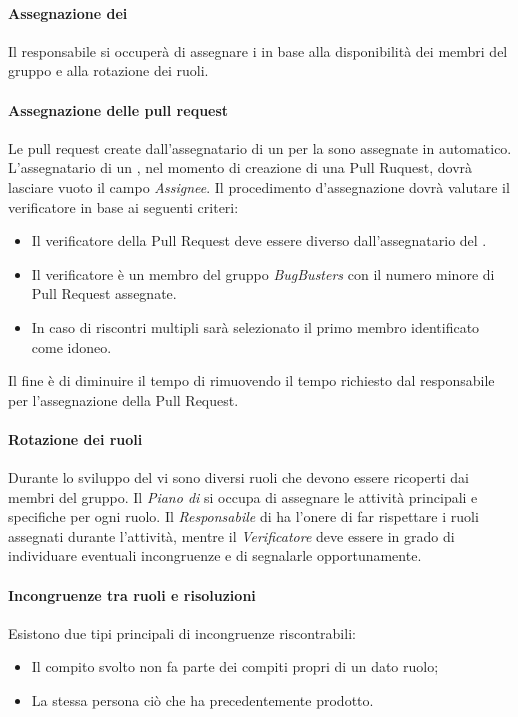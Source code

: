 \paragraph*{Assegnazione dei } Il responsabile si occuperà di assegnare i  in base alla disponibilità dei membri del gruppo e alla rotazione dei ruoli.

\paragraph*{Assegnazione  delle pull request} Le pull request create dall'assegnatario di un  per la  sono assegnate in automatico. L'assegnatario di un , nel momento di creazione di una Pull Ruquest, dovrà lasciare vuoto il campo \textit{Assignee}. Il procedimento d'assegnazione dovrà valutare il verificatore in base ai seguenti criteri:
\begin{itemize}
\item Il verificatore della Pull Request deve essere diverso dall'assegnatario del .
\item Il verificatore è un membro del gruppo \textit{BugBusters} con il numero minore di Pull Request assegnate.
\item In caso di riscontri multipli sarà selezionato il primo membro identificato come idoneo.
\end{itemize}

Il fine \`e di diminuire il tempo di  rimuovendo il tempo richiesto dal responsabile per l'assegnazione della Pull Request.

\paragraph*{Rotazione dei ruoli}

Durante lo sviluppo del  vi sono diversi ruoli che devono essere ricoperti dai membri del gruppo. Il \textit{Piano di } si occupa di assegnare le attività principali e specifiche per ogni ruolo. Il \textit{Responsabile} di  ha l'onere di far rispettare i ruoli assegnati durante l'attività, mentre il \textit{Verificatore} deve essere in grado di individuare eventuali incongruenze e di segnalarle opportunamente.
\paragraph*{Incongruenze tra ruoli e risoluzioni}
Esistono due tipi principali di incongruenze riscontrabili:
\begin{itemize}

\item Il compito svolto non fa parte dei compiti propri di un dato ruolo;
\item La stessa persona  ciò che ha precedentemente prodotto.
\end{itemize}

